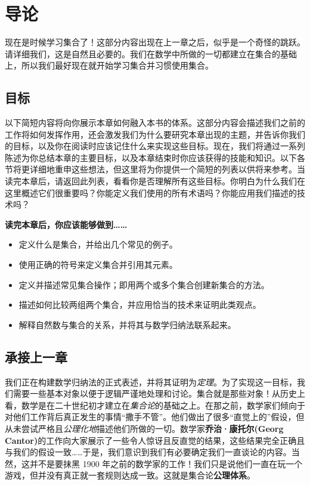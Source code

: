 \section{导论}

现在是时候学习集合了！这部分内容出现在上一章之后，似乎是一个奇怪的跳跃。请详细我们，这是自然且必要的。我们在数学中所做的一切都建立在集合的基础上，所以我们最好现在就开始学习集合并习惯使用集合。

\subsection{目标}

以下简短内容将向你展示本章如何融入本书的体系。这部分内容会描述我们之前的工作将如何发挥作用，还会激发我们为什么要研究本章出现的主题，并告诉你我们的目标，以及你在阅读时应该记住什么来实现这些目标。现在，我们将通过一系列陈述为你总结本章的主要目标，以及本章结束时你应该获得的技能和知识。以下各节将更详细地重申这些想法，但这里将为你提供一个简短的列表以供将来参考。当读完本章后，请返回此列表，看看你是否理解所有这些目标。你明白为什么我们在这里概述它们很重要吗？你能定义我们使用的所有术语吗？你能应用我们描述的技术吗？

\textbf{读完本章后，你应该能够做到……}

\begin{itemize}
    \item 定义什么是集合，并给出几个常见的例子。
    \item 使用正确的符号来定义集合并引用其元素。
    \item 定义并描述常见集合操作；即用两个或多个集合创建新集合的方法。
    \item 描述如何比较两组两个集合，并应用恰当的技术来证明此类观点。
    \item 解释自然数与集合的关系，并将其与数学归纳法联系起来。
\end{itemize}

\subsection{承接上一章}

我们正在构建数学归纳法的正式表述，并将其证明为\textit{定理}。为了实现这一目标，我们需要一些基本对象以便于逻辑严谨地处理和讨论。集合就是那些对象！从历史上看，数学是在二十世纪初才建立在\textit{集合论}的基础之上。在那之前，数学家们倾向于对他们工作背后真正发生的事情``撒手不管''。他们做出了很多``直觉上的''假设，但从未尝试严格且\textit{公理化地}描述他们所做的一切。数学家\textbf{乔治·康托尔(Georg Cantor)}的工作向大家展示了一些令人惊讶且反直觉的结果，这些结果完全正确且与我们的假设一致……于是，我们意识到我们有必要确定我们一直谈论的内容。当然，这并不是要抹黑 1900 年之前的数学家的工作！我们只是说他们一直在玩一个游戏，但并没有真正就一套规则达成一致。这就是集合论\textbf{公理体系}。

